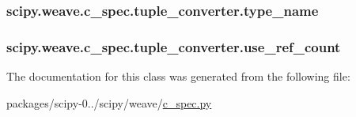 \subsubsection[{type\+\_\+name}]{\setlength{\rightskip}{0pt plus 5cm}scipy.\+weave.\+c\+\_\+spec.\+tuple\+\_\+converter.\+type\+\_\+name}\label{classscipy_1_1weave_1_1c__spec_1_1tuple__converter_ad01ea52119293ec2e080eb52e9196ac3}
\hypertarget{classscipy_1_1weave_1_1c__spec_1_1tuple__converter_a1eec3478286495943e2fb0872547520a}{}
\subsubsection[{use\+\_\+ref\+\_\+count}]{\setlength{\rightskip}{0pt plus 5cm}scipy.\+weave.\+c\+\_\+spec.\+tuple\+\_\+converter.\+use\+\_\+ref\+\_\+count}\label{classscipy_1_1weave_1_1c__spec_1_1tuple__converter_a1eec3478286495943e2fb0872547520a}


The documentation for this class was generated from the following file\+:\begin{DoxyCompactItemize}
\item 
packages/scipy-\/0../scipy/weave/\hyperlink{c__spec_8py}{c\+\_\+spec.\+py}\end{DoxyCompactItemize}
